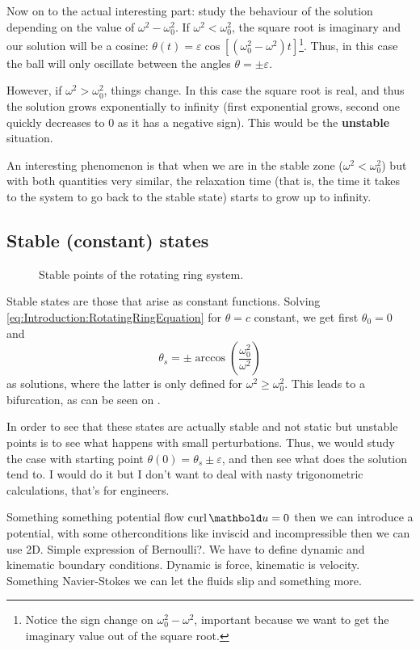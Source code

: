 \documentclass[palatino]{epflnotes}
\begin{document}
Now on to the actual interesting part: study the behaviour of the solution depending on the value of $ω^2 - ω_0^2$. If $ω^2 < ω_0^2$, the square root is imaginary and our solution will be a cosine: $θ(t) = ε \cos \left[(ω_0^2 - ω^2) t\right]$\footnote{Notice the sign change on $ω_0^2 - ω^2$, important because we want to get the imaginary value out of the square root.}. Thus, in this case the ball will only oscillate between the angles $θ = \pm ε$.

However, if $ω^2 > ω_0^2$, things change. In this case the square root is real, and thus the solution grows exponentially to infinity (first exponential grows, second one quickly decreases to 0 as it has a negative sign). This would be the \textbf{unstable} situation.

An interesting phenomenon is that when we are in the stable zone ($ω^2 < ω_0^2$) but with both quantities very similar, the relaxation time (that is, the time it takes to the system to go back to the stable state) starts to grow up to infinity.

\subsection{Stable (constant) states}

\begin{figure}[hbtp]
\caption{Stable points of the rotating ring system.}
\label{fig:Introduction:RotatingRingStable}
\end{figure}

Stable states are those that arise as constant functions. Solving \eqref{eq:Introduction:RotatingRingEquation} for $θ = c$ constant, we get first $θ_0 = 0$ and \[ θ_s = \pm \arccos\left(\frac{ω_0^2}{ω^2}\right)\] as solutions, where the latter is only defined for $ω^2 ≥ ω_0^2$. This leads to a bifurcation, as can be seen on .

In order to see that these states are actually stable and not static but unstable points is to see what happens with small perturbations. Thus, we would study the case with starting point $θ(0) = θ_s \pm ε$, and then see what does the solution tend to. I would do it but I don't want to deal with nasty trigonometric calculations, that's for engineers.



Something something potential flow $\curl \vu = 0$ then we can introduce a potential, with some otherconditions like inviscid and incompressible then we can use 2D. Simple expression of Bernoulli?. We have to define dynamic and kinematic boundary conditions. Dynamic is force, kinematic is velocity. Something Navier-Stokes we can let the fluids slip and something more.
\end{document}
